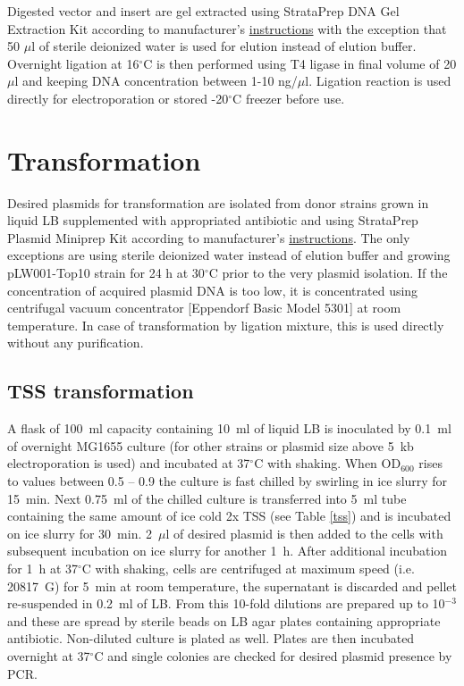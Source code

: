 Digested vector and insert are gel extracted using StrataPrep DNA Gel Extraction Kit according to manufacturer's \href{https://www.agilent.com/cs/library/usermanuals/public/400766.pdf}{instructions} with the exception that 50 $\mu$l of sterile deionized water is used for elution instead of elution buffer.
Overnight ligation at 16$^{\circ}$C is then performed using T4 ligase in final volume of 20 $\mu$l and keeping DNA concentration between 1-10 ng/$\mu$l.
Ligation reaction is used directly for electroporation or stored -20$^{\circ}$C freezer before use.

\section{Transformation}
Desired plasmids for transformation are isolated from donor strains grown in liquid LB supplemented with appropriated antibiotic and using StrataPrep Plasmid Miniprep Kit according to manufacturer's \href{https://www.agilent.com/cs/library/usermanuals/public/400766.pdf}{instructions}.
The only exceptions are using sterile deionized water instead of elution buffer and growing pLW001-Top10 strain for 24 h at 30$^{\circ}$C prior to the very plasmid isolation.
If the concentration of acquired plasmid DNA is too low, it is concentrated using centrifugal vacuum concentrator [Eppendorf\textsuperscript{\textregistered} Basic Model 5301] at room temperature.
In case of transformation by ligation mixture, this is used directly without any purification.

\subsection{TSS transformation}
A flask of 100~ml capacity containing 10~ml of liquid LB is inoculated by 0.1~ml of overnight MG1655 culture (for other strains or plasmid size above 5~kb electroporation is used) and incubated at 37$^{\circ}$C with shaking.
When OD$_{600}$ rises to values between 0.5 -- 0.9 the culture is fast chilled by swirling in ice slurry for 15~min.
Next 0.75~ml of the chilled culture is transferred into 5~ml tube containing the same amount of ice cold 2x TSS (see Table \ref{tss}) and is incubated on ice slurry for 30~min.
2~$\mu$l of desired plasmid is then added to the cells with subsequent incubation on ice slurry for another 1~h.
After additional incubation for 1~h at 37$^{\circ}$C with shaking, cells are centrifuged at maximum speed (i.e. 20817~G) for 5~min at room temperature, the supernatant is discarded and pellet re-suspended in 0.2~ml of LB.
From this 10-fold dilutions are prepared up to 10$^{-3}$ and these are spread by sterile beads on LB agar plates containing appropriate antibiotic.
Non-diluted culture is plated as well.
Plates are then incubated overnight at 37$^{\circ}$C and single colonies are checked for desired plasmid presence by PCR.

